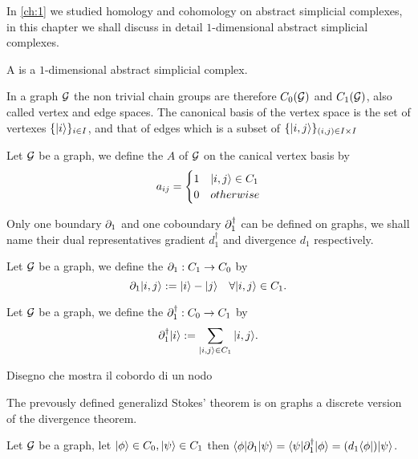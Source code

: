 \documentclass[../2.tex]{subfiles}
\begin{document}
    In \autoref{ch:1} we studied homology and cohomology on abstract simplicial complexes, in this chapter we shall discuss in detail
    $1$-dimensional abstract simplicial complexes.

    \begin{defn}
        A  is a $1$-dimensional abstract simplicial complex.
    \end{defn}

    In a graph $\mathcal{G}$ the non trivial chain groups are therefore $C_0(\mathcal{G})$ and $C_1(\mathcal{G})$, also called vertex and edge spaces. 
    The canonical basis of the vertex space is the set of vertexes $\{| i \rangle\}_{i \in I}$, and that of edges which is a subset of $\{| i,j \rangle\}_{(i,j)\in I\times I}$

    \begin{defn}
        Let $\mathcal{G}$ be a graph, we define the  $A$ of $\mathcal{G}$ on the canical vertex basis by
        \[a_{ij} = 
        \begin{cases}
            1 & | i,j \rangle \in C_1 \\
            0 & otherwise \\
        \end{cases} \]        
    \end{defn}
    Only one boundary $\partial_1$ and one coboundary $\partial_1^\dagger$ can be defined on graphs, we shall name their dual representatives gradient $d_1^\dagger$ and divergence $d_1$ respectively.

    \begin{defn}
        Let $\mathcal{G}$ be a graph, we define the  $\partial_1 : C_1 \to C_0$ by 
        \[ \partial_1| i,j \rangle := | i \rangle - | j \rangle \quad \forall | i,j \rangle \in C_1.\]
    \end{defn}
    
    \begin{defn}
        Let $\mathcal{G}$ be a graph, we define the  $\partial^\dagger_1 : C_0 \to C_1$ by 
        \[ \partial^\dagger_1| i \rangle := \sum_{| i,j \rangle \in C_1} | i,j \rangle.\]
    \end{defn}

    {\color{red} Disegno che mostra il cobordo di un nodo}

    The prevously defined generalizd Stokes' theorem is on graphs a discrete version of the divergence theorem.

    \begin{thm}
        Let $\mathcal{G}$ be a graph, let $| \phi \rangle \in C_0, | \psi \rangle \in C_1$ then $\langle \phi |\partial_1| \psi \rangle = \langle \psi |\partial_1^\dagger| \phi \rangle = (d_1\langle \phi |)| \psi \rangle$.
    \end{thm}
\end{document}

